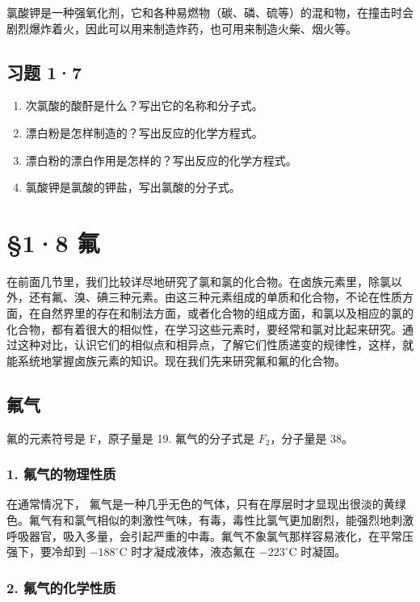 氯酸钾是一种强氧化剂，它和各种易燃物（碳、磷、硫等）的混和物，在撞击时会剧烈爆炸着火，因此可以用来制造炸药，也可用来制造火柴、烟火等。

\subsection{习题 1·7}

\begin{enumerate}
\item
  次氯酸的酸酐是什么？写出它的名称和分子式。
\item
  漂白粉是怎样制造的？写出反应的化学方程式。
\item
  漂白粉的漂白作用是怎样的？写出反应的化学方程式。
\item
  氯酸钾是氯酸的钾盐，写出氯酸的分子式。
\end{enumerate}

\section{§1·8 氟}

在前面几节里，我们比较详尽地研究了氯和氯的化合物。在卤族元素里，除氯以外，还有氟、溴、碘三种元素。由这三种元素组成的单质和化合物，不论在性质方面，在自然界里的存在和制法方面，或者化合物的组成方面，和氯以及相应的氯的化合物，都有着很大的相似性，在学习这些元素时，要经常和氯对比起来研究。通过这种对比，认识它们的相似点和相异点，了解它们性质递变的规律性，这样，就能系统地掌握卤族元素的知识。现在我们先来研究氟和氟的化合物。

\subsection{氟气}

氟的元素符号是 F，原子量是 19. 氟气的分子式是 \(F_{2}\)，分子量是 38。

\subsubsection{1. 氟气的物理性质}

在通常情况下，
氟气是一种几乎无色的气体，只有在厚层时才显现出很淡的黄绿色。氟气有和氯气相似的刺激性气味，有毒，毒性比氯气更加剧烈，能强烈地刺激呼吸器官，吸入多量，会引起严重的中毒。氟气不象氯气那样容易液化，在平常压强下，要冷却到
\(-188^{\circ}\mathrm{C}\) 时才凝成液体，液态氟在
\(-223^{\circ}\mathrm{C}\) 时凝固。

\subsubsection{2. 氟气的化学性质}

